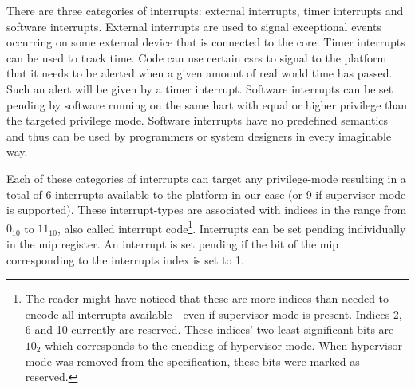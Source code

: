 There are three categories of interrupts: external interrupts, timer interrupts and software interrupts.
External interrupts are used to signal exceptional events occurring on some external device that is connected to the core.
Timer interrupts can be used to track time.
Code can use certain \glspl{csr} to signal to the platform that it needs to be alerted when a given amount of real world time has passed.
Such an alert will be given by a timer interrupt.
Software interrupts can be set pending by software running on the same \gls{hart} with equal or higher privilege than the targeted privilege mode.
Software interrupts have no predefined semantics and thus can be used by programmers or system designers in every imaginable way.


Each of these categories of interrupts can target any privilege-mode resulting in a total of 6 interrupts available to the platform in our case (or 9 if supervisor-mode is supported).
These interrupt-types are associated with indices in the range from $ 0_{10} $ to $ 11_{10} $, also called interrupt code\footnote{%
    The reader might have noticed that these are more indices than needed to encode all interrupts available - even if supervisor-mode is present.
    Indices 2, 6 and 10 currently are reserved.
    These indices' two least significant bits are $ 10_2 $ which corresponds to the encoding of hypervisor-mode.
    When hypervisor-mode was removed from the specification, these bits were marked as reserved.
}.
Interrupts can be set pending individually in the \gls{mip} register.
An interrupt is set pending if the bit of the \gls{mip} corresponding to the interrupts index is set to 1.

